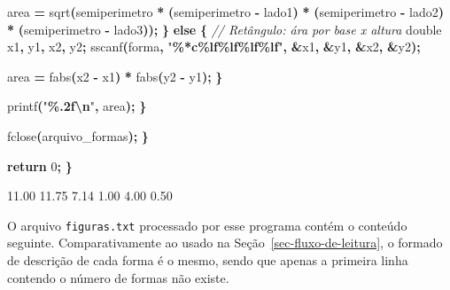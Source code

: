 \documentclass[
  11pt,
  a4paper,
]{scrbook}
\newenvironment{Shaded}{\begin{snugshade}}{\end{snugshade}}
\newcommand{\CommentTok}[1]{\textcolor[rgb]{0.56,0.35,0.01}{\textit{#1}}}
\newcommand{\ControlFlowTok}[1]{\textcolor[rgb]{0.13,0.29,0.53}{\textbf{#1}}}
\newcommand{\DataTypeTok}[1]{\textcolor[rgb]{0.13,0.29,0.53}{#1}}
\newcommand{\DecValTok}[1]{\textcolor[rgb]{0.00,0.00,0.81}{#1}}
\newcommand{\NormalTok}[1]{#1}
\newcommand{\OperatorTok}[1]{\textcolor[rgb]{0.81,0.36,0.00}{\textbf{#1}}}
\newcommand{\SpecialCharTok}[1]{\textcolor[rgb]{0.81,0.36,0.00}{\textbf{#1}}}
\newcommand{\StringTok}[1]{\textcolor[rgb]{0.31,0.60,0.02}{#1}}
\begin{document}
\begin{Shaded}
\begin{Highlighting}[]
\NormalTok{                area }\OperatorTok{=}\NormalTok{ sqrt}\OperatorTok{(}\NormalTok{semiperimetro }\OperatorTok{*} \OperatorTok{(}\NormalTok{semiperimetro }\OperatorTok{{-}}\NormalTok{ lado1}\OperatorTok{)} \OperatorTok{*}
                            \OperatorTok{(}\NormalTok{semiperimetro }\OperatorTok{{-}}\NormalTok{ lado2}\OperatorTok{)} \OperatorTok{*} \OperatorTok{(}\NormalTok{semiperimetro }\OperatorTok{{-}}\NormalTok{ lado3}\OperatorTok{));}
            \OperatorTok{\}}
            \ControlFlowTok{else} \OperatorTok{\{}
                \CommentTok{// Retângulo: ára por base x altura}
                \DataTypeTok{double}\NormalTok{ x1}\OperatorTok{,}\NormalTok{ y1}\OperatorTok{,}\NormalTok{ x2}\OperatorTok{,}\NormalTok{ y2}\OperatorTok{;}
\NormalTok{                sscanf}\OperatorTok{(}\NormalTok{forma}\OperatorTok{,} \StringTok{"}\SpecialCharTok{\%*c\%lf\%lf\%lf\%lf}\StringTok{"}\OperatorTok{,} \OperatorTok{\&}\NormalTok{x1}\OperatorTok{,} \OperatorTok{\&}\NormalTok{y1}\OperatorTok{,} \OperatorTok{\&}\NormalTok{x2}\OperatorTok{,} \OperatorTok{\&}\NormalTok{y2}\OperatorTok{);}

\NormalTok{                area }\OperatorTok{=}\NormalTok{ fabs}\OperatorTok{(}\NormalTok{x2 }\OperatorTok{{-}}\NormalTok{ x1}\OperatorTok{)} \OperatorTok{*}\NormalTok{ fabs}\OperatorTok{(}\NormalTok{y2 }\OperatorTok{{-}}\NormalTok{ y1}\OperatorTok{);}
            \OperatorTok{\}}

\NormalTok{            printf}\OperatorTok{(}\StringTok{"}\SpecialCharTok{\%.2f\textbackslash{}n}\StringTok{"}\OperatorTok{,}\NormalTok{ area}\OperatorTok{);}
        \OperatorTok{\}}

\NormalTok{        fclose}\OperatorTok{(}\NormalTok{arquivo\_formas}\OperatorTok{);}
    \OperatorTok{\}}

    \ControlFlowTok{return} \DecValTok{0}\OperatorTok{;}
\OperatorTok{\}}
\end{Highlighting}
\end{Shaded}

\begin{Shaded}
\begin{Highlighting}[]
\NormalTok{11.00}
\NormalTok{11.75}
\NormalTok{7.14}
\NormalTok{1.00}
\NormalTok{4.00}
\NormalTok{0.50}
\end{Highlighting}
\end{Shaded}

O arquivo \texttt{figuras.txt} processado por esse programa contém o
conteúdo seguinte. Comparativamente ao usado na
Seção~\ref{sec-fluxo-de-leitura}, o formado de descrição de cada forma é
o mesmo, sendo que apenas a primeira linha contendo o número de formas
não existe.
\end{document}
